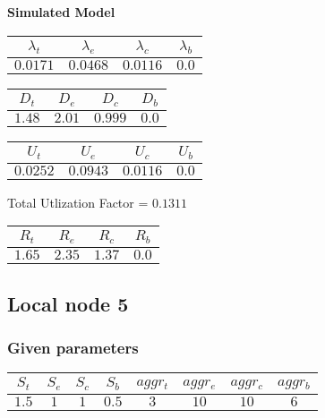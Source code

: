 \documentclass{article}
\begin{document}
\begin{minipage}{0.5\textwidth}
\centering	\textbf{Simulated Model}
\begin{table}[H]
\centering
\begin{tabular}{@{}cccc@{}}
\toprule
$\lambda_t$ & $\lambda_e$ & $\lambda_c$ & $\lambda_b$\\
\midrule
$0.0171$ & $0.0468$ & $0.0116$ & $0.0$\\
\bottomrule
\end{tabular}
\end{table}
\begin{table}[H]
\centering
\begin{tabular}{@{}cccc@{}}
\toprule
$D_t$ & $D_e$ & $D_c$ & $D_b$\\
\midrule
$1.48$ & $2.01$ & $0.999$ & $0.0$\\
\bottomrule
\end{tabular}
\end{table}\begin{table}[H]
\centering
\begin{tabular}{@{}cccc@{}}
\toprule
$U_t$ & $U_e$ & $U_c$ & $U_b$\\
\midrule
$0.0252$ & $0.0943$ & $0.0116$ & $0.0$\\
\bottomrule
\end{tabular}
\end{table}
\centering Total Utlization Factor = $0.1311$
\begin{table}[H]
\centering
\begin{tabular}{@{}cccc@{}}
\toprule
$R_t$ & $R_e$ & $R_c$ & $R_b$\\
\midrule
$1.65$ & $2.35$ & $1.37$ & $0.0$\\
\bottomrule
\end{tabular}
\end{table}
\end{minipage}
\newpage\subsection{Local node 5}
\subsubsection{Given parameters}
\begin{table}[H]
\centering
\begin{tabular}{@{}cccc|cccc@{}}
\toprule
$S_t$ & $S_e$ & $S_c$ & $S_b$ & $aggr_t$ & $aggr_e$ & $aggr_c$ & $aggr_b$\\
\midrule
$1.5$ & $1$ & $1$ & $0.5$ & $3$ & $10$ & $10$ & $6$\\
\bottomrule
\end{tabular}
\end{table}
\end{document}
